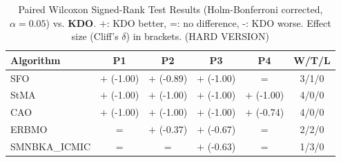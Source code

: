 \begin{table}[htbp]
\centering
\caption{Paired Wilcoxon Signed-Rank Test Results (Holm-Bonferroni corrected, $\alpha=0.05$) vs. \textbf{KDO}. +: KDO better, =: no difference, -: KDO worse. Effect size (Cliff's $\delta$) in brackets. (HARD VERSION)}
\label{tab:wilcoxon_advanced}
\small
\begin{tabular}{lccccc}
\toprule
\textbf{Algorithm} & \textbf{P1} & \textbf{P2} & \textbf{P3} & \textbf{P4} & \textbf{W/T/L} \\
\midrule
SFO & $+$ (-1.00) & $+$ (-0.89) & $+$ (-1.00) & $=$ & 3/1/0 \\
StMA & $+$ (-1.00) & $+$ (-1.00) & $+$ (-1.00) & $+$ (-1.00) & 4/0/0 \\
CAO & $+$ (-1.00) & $+$ (-1.00) & $+$ (-1.00) & $+$ (-0.74) & 4/0/0 \\
ERBMO & $=$ & $+$ (-0.37) & $+$ (-0.67) & $=$ & 2/2/0 \\
SMNBKA_ICMIC & $=$ & $=$ & $+$ (-0.63) & $=$ & 1/3/0 \\
\bottomrule
\end{tabular}
\end{table}
